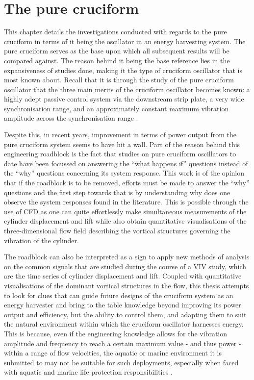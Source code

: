 \documentclass[oneside]{utmthesis}
\begin{document}
\section{The pure cruciform}\label{sec:svivRegime}
This chapter details the investigations conducted with regards to the pure cruciform in terms of it being the oscillator in an energy harvesting system. The pure cruciform serves as the base upon which all subsequent results will be compared against. The reason behind it being the base reference lies in the expansiveness of studies done, making it the type of cruciform oscillator that is most known about. Recall that it is through the study of the pure cruciform oscillator that the three main merits of the cruciform oscillator becomes known: a highly adept passive control system via the downstream strip plate, a very wide synchronisation range, and an approximately constant maximum vibration amplitude across the synchronisation range \citep{Koide2013}.

Despite this, in recent years, improvement in terms of power output from the pure cruciform system seems to have hit a wall. Part of the reason behind this engineering roadblock is the fact that studies on pure cruciform oscillators to date have been focussed on answering the ``what happens if'' questions instead of the ``why'' questions concerning its system response. This work is of the opinion that if the roadblock is to be removed, efforts must be made to answer the ``why'' questions and the first step towards that is by understanding why does one observe the system responses found in the literature. This is possible through the use of CFD as one can quite effortlessly make simultaneous measurements of the cylinder displacement and lift while also obtain quantitative visualisations of the three-dimensional flow field describing the vortical structures governing the vibration of the cylinder.

The roadblock can also be interpreted as a sign to apply new methods of analysis on the common signals that are studied during the course of a VIV study, which are the time series of cylinder displacement and lift. Coupled with quantitative visualisations of the dominant vortical structures in the flow, this thesis attempts to look for clues that can guide future designs of the cruciform system as an energy harvester and bring to the table knowledge beyond improving its power output and efficiency, but the ability to control them, and adapting them to suit the natural environment within which the cruciform oscillator harnesses energy. This is because, even if the engineering knowledge allows for the vibration amplitude and frequency to reach a certain maximum value - and thus power - within a range of flow velocities, the aquatic or marine environment it is submitted to may not be suitable for such deployments, especially when faced with aquatic and marine life protection responsibilities \citep{Raghavan2007}.
\end{document}
